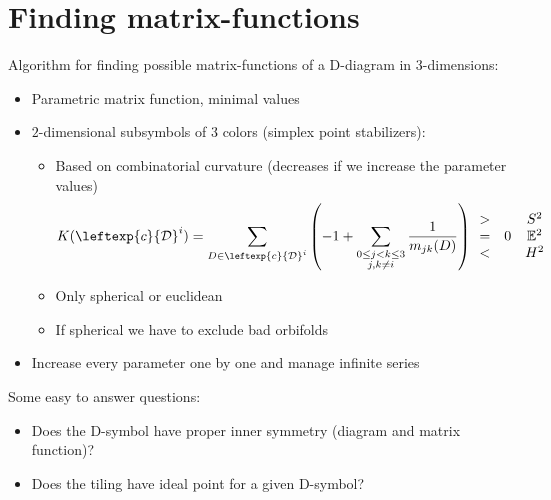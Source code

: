 \section{Finding matrix-functions}
\begin{frame}
  Algorithm for finding possible matrix-functions of a D-diagram in
  $3$-dimensions:
  \begin{itemize}
    \item Parametric matrix function, minimal values
    \item $2$-dimensional subsymbols of 3 colors (simplex point stabilizers):
      \begin{itemize}
	\item Based on combinatorial curvature (decreases if we increase the
	  parameter values)
	  \begin{align*}
	    K(\leftexp{c}{\mathcal{D}}^i)=\sum_{D\in
	    \leftexp{c}{\mathcal{D}}^i}\left(-1+\sum_{\substack{0\le j<k\le 3 \\
	    j,k\ne i}}\frac{1}{m_{jk}(D)}\right)
	    \begin{array}{cccc}
	      > & & S^2 \\
	      = & 0 & \mathbb{E}^2 \\
	      < & & H^2
	    \end{array}
	  \end{align*}
	\item Only spherical or euclidean
	\item If spherical we have to exclude bad orbifolds
      \end{itemize}
    \item Increase every parameter one by one and manage infinite series
  \end{itemize}
  Some easy to answer questions:
  \begin{itemize}
    \item Does the D-symbol have proper inner symmetry (diagram and matrix function)?
    \item Does the tiling have ideal point for a given D-symbol?
  \end{itemize}
\end{frame}


